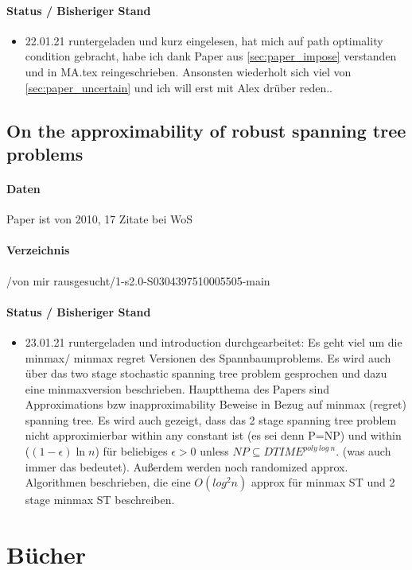 \documentclass[paper=a4,10pt]{scrartcl}
\begin{document}
\paragraph{Status / Bisheriger Stand}
\begin{itemize}
\item 22.01.21 runtergeladen und kurz eingelesen, hat mich auf path optimality condition gebracht, habe ich dank Paper aus \ref{sec:paper_impose} verstanden und in MA.tex reingeschrieben. Ansonsten wiederholt sich viel von \ref{sec:paper_uncertain} und ich will erst mit Alex drüber reden..
\end{itemize}

\subsection{On the approximability of robust spanning tree problems}
\label{sec:paper_robust_minmax}
\paragraph{Daten} Paper ist von 2010, 17 Zitate bei WoS
\paragraph{Verzeichnis}  /von mir rausgesucht/1-s2.0-S0304397510005505-main
\paragraph{Status / Bisheriger Stand}
\begin{itemize}
\item 23.01.21 runtergeladen und introduction durchgearbeitet: Es geht viel um die minmax/ minmax regret Versionen des Spannbaumproblems. Es wird auch über das two stage stochastic spanning tree problem gesprochen und dazu eine minmaxversion beschrieben. Hauptthema des Papers sind Approximations bzw inapproximability Beweise in Bezug auf minmax (regret) spanning tree.
Es wird auch gezeigt, dass das 2 stage spanning tree problem nicht approximierbar within any constant ist (es sei denn P=NP) und within ($(1-\epsilon) \ln n$) für beliebiges $\epsilon >0$ unless $NP \subseteq DTIME^{poly \ log \ n}$. (was auch immer das bedeutet). Außerdem werden noch randomized approx. Algorithmen beschrieben, die eine $O(log^2 n)$ approx für minmax ST und 2 stage minmax ST beschreiben.
\end{itemize}


\section{Bücher}
\end{document}
